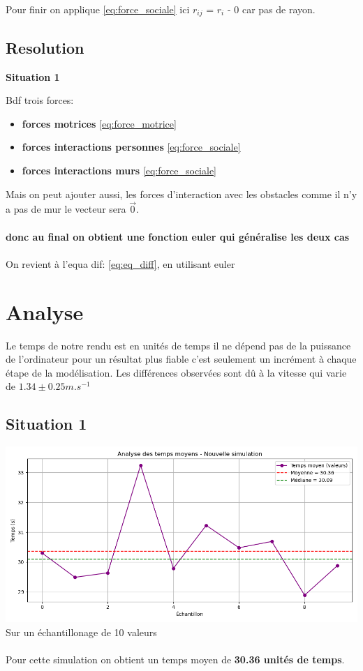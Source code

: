 \documentclass[a4paper,12pt]{article}
\begin{document}
Pour finir on applique \eqref{eq:force_sociale} ici $r_{ij}$ = $r_i$ - 0 car pas de rayon.

\subsection{Resolution}

\textbf{Situation 1}

Bdf trois forces:
\begin{itemize}
	\item \textbf{forces motrices} \eqref{eq:force_motrice}
	\item \textbf{forces interactions personnes} \eqref{eq:force_sociale}
	\item \textbf{forces interactions murs} \eqref{eq:force_sociale}
\end{itemize}
Mais on peut ajouter aussi, les forces d'interaction avec les obstacles comme il n'y a pas de mur le vecteur sera $\vec{0}$.
\\
\\
\textbf{donc au final on obtient une fonction euler qui généralise les deux cas}
\\
\\
On revient à l'equa dif: \eqref{eq:eq_diff}, en utilisant euler


\section{Analyse}
Le temps de notre rendu est en unités de temps il ne dépend pas de la puissance de l'ordinateur pour un résultat plus fiable c'est seulement un incrément à chaque étape de la modélisation. Les différences observées sont dû à la vitesse qui varie de $1.34 \pm 0.25 m.s^{-1}$
\subsection{Situation 1}

\includegraphics[width=\textwidth]{resultat.png} %
Sur un échantillonage de 10 valeurs
\\
\\
Pour cette simulation on obtient un temps moyen de \textbf{30.36 unités de temps}.
\end{document}
